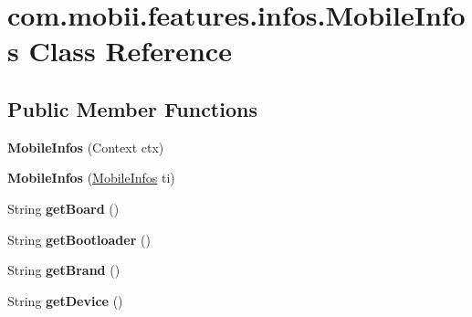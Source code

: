 \hypertarget{classcom_1_1mobii_1_1features_1_1infos_1_1_mobile_infos}{\section{com.\-mobii.\-features.\-infos.\-Mobile\-Infos Class Reference}
\label{classcom_1_1mobii_1_1features_1_1infos_1_1_mobile_infos}
}
\subsection*{Public Member Functions}
\begin{DoxyCompactItemize}
\item 
\hypertarget{classcom_1_1mobii_1_1features_1_1infos_1_1_mobile_infos_a298fb14436f173f7796989206a890b5c}{{\bfseries Mobile\-Infos} (Context ctx)}\label{classcom_1_1mobii_1_1features_1_1infos_1_1_mobile_infos_a298fb14436f173f7796989206a890b5c}

\item 
\hypertarget{classcom_1_1mobii_1_1features_1_1infos_1_1_mobile_infos_a31d8a0d19d90604b75a288eb343441b1}{{\bfseries Mobile\-Infos} (\hyperlink{classcom_1_1mobii_1_1features_1_1infos_1_1_mobile_infos}{Mobile\-Infos} ti)}\label{classcom_1_1mobii_1_1features_1_1infos_1_1_mobile_infos_a31d8a0d19d90604b75a288eb343441b1}

\item 
\hypertarget{classcom_1_1mobii_1_1features_1_1infos_1_1_mobile_infos_a0842f73d43d84774334fdd54db9b9268}{String {\bfseries get\-Board} ()}\label{classcom_1_1mobii_1_1features_1_1infos_1_1_mobile_infos_a0842f73d43d84774334fdd54db9b9268}

\item 
\hypertarget{classcom_1_1mobii_1_1features_1_1infos_1_1_mobile_infos_a1feb53cd1e258765da9232f53b563a14}{String {\bfseries get\-Bootloader} ()}\label{classcom_1_1mobii_1_1features_1_1infos_1_1_mobile_infos_a1feb53cd1e258765da9232f53b563a14}

\item 
\hypertarget{classcom_1_1mobii_1_1features_1_1infos_1_1_mobile_infos_af381d3be917766a693331ae4601d8f72}{String {\bfseries get\-Brand} ()}\label{classcom_1_1mobii_1_1features_1_1infos_1_1_mobile_infos_af381d3be917766a693331ae4601d8f72}

\item 
\hypertarget{classcom_1_1mobii_1_1features_1_1infos_1_1_mobile_infos_acd767743d726e37d4c8a3d5807855b64}{String {\bfseries get\-Device} ()}\label{classcom_1_1mobii_1_1features_1_1infos_1_1_mobile_infos_acd767743d726e37d4c8a3d5807855b64}


\end{DoxyCompactItemize}
